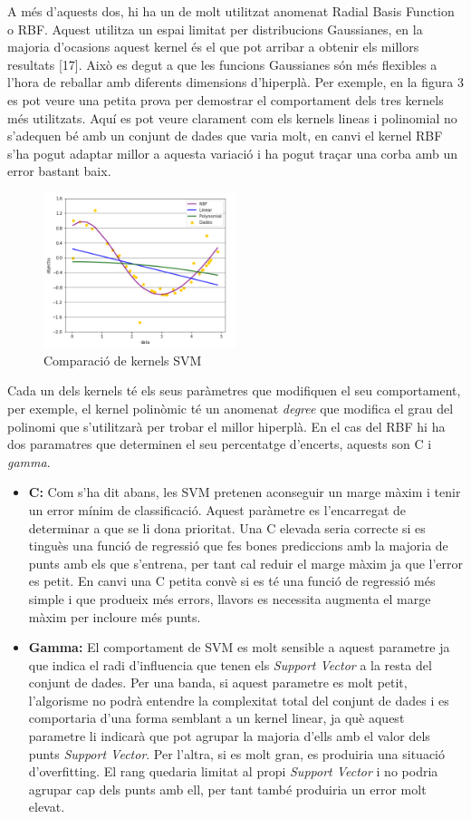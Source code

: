 \documentclass[10pt,a4paper,twocolumn,twoside]{article}
\begin{document}
A més d'aquests dos, hi ha un de molt utilitzat anomenat Radial Basis Function o RBF. Aquest utilitza un espai limitat per distribucions Gaussianes, en la majoria d'ocasions aquest kernel és el que pot arribar a obtenir els millors resultats [17]. Això es degut a que les funcions Gaussianes són més flexibles a l'hora de reballar amb diferents dimensions d'hiperplà. Per exemple, en la figura 3 es pot veure una petita prova per demostrar el comportament dels tres kernels més utilitzats. Aquí es pot veure clarament com els kernels lineas i polinomial no s'adequen bé amb un conjunt de dades que varia molt, en canvi el kernel RBF s'ha pogut adaptar millor a aquesta variació i ha pogut traçar una corba amb un error bastant baix. 
\begin{figure}[!h]
\centering
	\includegraphics[width=0.5\textwidth]{../img/KernelsSVM}
	\caption{Comparació de kernels SVM}
	\label{fig-KernelsSVM}
\end{figure}

Cada un dels kernels té els seus paràmetres que modifiquen el seu comportament, per exemple, el kernel polinòmic té un anomenat \textit{degree} que modifica el grau del polinomi que s'utilitzarà per trobar el millor hiperplà. En el cas del RBF hi ha dos paramatres que determinen el seu percentatge d'encerts, aquests son C i \textit{gamma}.  
 \begin{itemize}
\item \textbf{C:} Com s'ha dit abans, les SVM pretenen aconseguir un marge màxim i tenir un error mínim de classificació. Aquest paràmetre es l'encarregat de determinar a que se li dona prioritat. Una C elevada seria correcte si es tinguès una funció de regressió que fes bones prediccions amb la majoria de punts amb els que s'entrena, per tant cal reduir el marge màxim ja que l'error es petit. En canvi una C petita convè si es té una funció de regressió més simple i que produeix més errors, llavors es necessita augmenta el marge màxim per incloure més punts.
\item \textbf{Gamma:} El comportament de SVM es molt sensible a aquest parametre ja que indica el radi d'influencia que tenen els \textit{Support Vector} a la resta del conjunt de dades. Per una banda, si aquest parametre es molt petit, l'algorisme no podrà entendre la complexitat total del conjunt de dades i es comportaria d'una forma semblant a un kernel linear, ja què aquest parametre li indicarà que pot agrupar la majoria d'ells amb el valor dels punts \textit{Support Vector}. Per l'altra, si es molt gran, es produiria una situació d'overfitting. El rang quedaria limitat al propi \textit{Support Vector} i no podria agrupar cap dels punts amb ell, per tant també produiria un error molt elevat.
\end{itemize}
\end{document}
